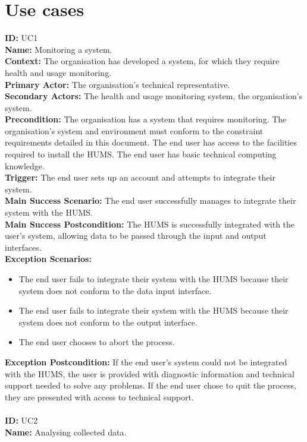 \documentclass[10pt,a4paper]{article}
\begin{document}
\section{Use cases}
\noindent \textbf{ID:} UC1\\
\textbf{Name:} Monitoring a system.\\
\textbf{Context:} The organisation has developed a system, for which they
require health and usage monitoring.\\
\textbf{Primary Actor:} The organisation's technical representative.\\
\textbf{Secondary Actors:} The health and usage monitoring system, the
organisation's system.\\
\textbf{Precondition:}  The organisation has a system that requires monitoring.
The organisation's system and environment must conform to the constraint
requirements detailed in this document. The end user has access to the
facilities required to install the HUMS. The end user has basic technical
computing knowledge.\\
\textbf{Trigger:} The end user sets up an account and attempts to integrate
their system.\\
\textbf{Main Success Scenario:} The end user successfully manages to integrate
their system with the HUMS.\\
\textbf{Main Success Postcondition:} The HUMS is successfully integrated with
the user's system, allowing data to be passed through the input and output
interfaces.\\
\textbf{Exception Scenarios:}
\begin{itemize}
\item The end user fails to integrate their system with the HUMS because their
system does not conform to the data input interface.
\item The end user fails to integrate their system with the HUMS because their
system does not conform to the output interface.
\item The end user chooses to abort the process.
\end{itemize}
\textbf{Exception Postcondition:} If the end user's system could not be
integrated with the HUMS, the user is provided with diagnostic information and
technical support needed to solve any problems. If the end user chose to quit
the process, they are presented with access to technical support.\\\\
\noindent \textbf{ID:} UC2\\
\textbf{Name:} Analysing collected data.\\
\end{document}
